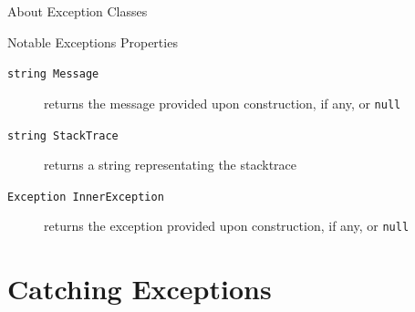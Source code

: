 \documentclass[presentation]{beamer}
\begin{document}
\begin{frame}[allowframebreaks]{About Exception Classes}
  \begin{exampleblock}{Notable Exceptions Properties}
    \begin{description}
      \item[\texttt{string Message}] returns the message provided upon construction, if any, or \texttt{null}
      \item[\texttt{string StackTrace}] returns a string representating the stacktrace
      \item[\texttt{Exception InnerException}] returns the exception provided upon construction, if any, or \texttt{null}
    \end{description}
  \end{exampleblock}

\end{frame}

\section{Catching Exceptions}
\end{document}
